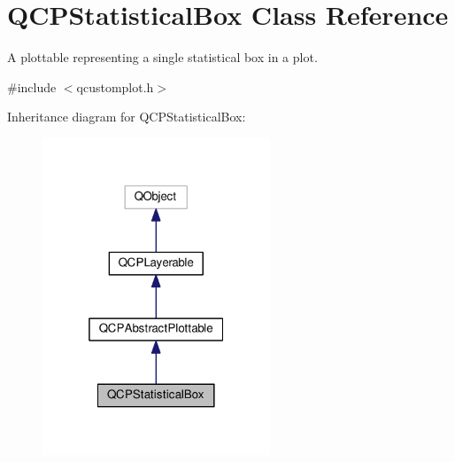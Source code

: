 \hypertarget{classQCPStatisticalBox}{}\section{Q\+C\+P\+Statistical\+Box Class Reference}
\label{classQCPStatisticalBox}


A plottable representing a single statistical box in a plot.  




{\ttfamily \#include $<$qcustomplot.\+h$>$}



Inheritance diagram for Q\+C\+P\+Statistical\+Box\+:\nopagebreak
\begin{figure}[H]
\begin{center}
\leavevmode
\includegraphics[width=193pt]{classQCPStatisticalBox__inherit__graph}
\end{center}
\end{figure}



